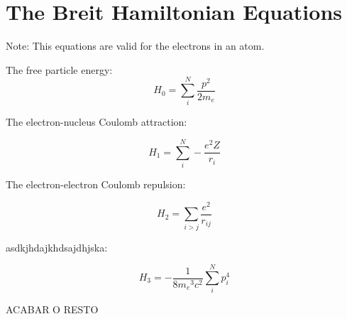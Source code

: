 
%
\label{ap:Breit}

\chapter{The Breit Hamiltonian Equations}

Note: This equations are valid for the electrons in an atom.


The free particle energy:
\begin{equation}
    \displaystyle H_0=\sum_i^N \frac{p^2}{2m_e}
\end{equation}

The electron-nucleus Coulomb attraction:

\begin{equation}
    \displaystyle H_1 = \sum_i^N -\frac{e^2 Z}{r_i}
\end{equation}

The electron-electron Coulomb repulsion:

\begin{equation}
    H_2 = \displaystyle \sum_{i>j}\frac{e^2}{r_{ij}}
\end{equation}

asdkjhdajkhdsajdhjska:

\begin{equation}
    H_3 = -\frac{1}{8 {m_e}^3 c^2}\sum_{i}^{N} p_i^4
\end{equation}


ACABAR O RESTO